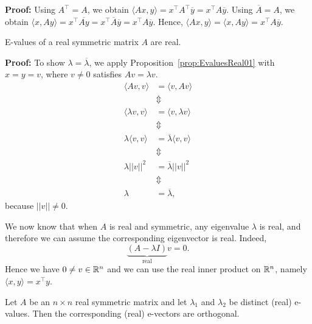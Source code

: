 \textbf{Proof:}  Using $A^\top = A$, we obtain $\langle Ax, y\rangle = x^\top A^\top \overline{y}= x^\top A \overline{y}$. Using $\overline{A} = A$, we obtain $\langle x, Ay \rangle = x^\top \overline{Ay} = x^\top \overline{A} \overline{y} = x^\top A \overline{y}$. Hence,  $\langle Ax, y\rangle = \langle x, Ay \rangle =  x^\top A \overline{y}$. \Qed


\begin{prop}
 E-values of a real symmetric matrix $A$ are real. 
\end{prop}

\textbf{Proof:} To show $\lambda=\overline{\lambda}$, we apply Proposition~\ref{prop:EvaluesReal01} with $x=y=v$, where $v\neq 0$ satisfies $Av = \lambda v$.
\begin{align*}
     \langle Av, v \rangle & =  \langle v, Av \rangle \\
     & \Updownarrow \\
     \langle \lambda v, v \rangle & =  \langle v, \lambda v \rangle \\
     & \Updownarrow \\
     \lambda \langle v, v \rangle & =  \overline{\lambda} \langle v, v \rangle \\
     & \Updownarrow \\
      \lambda ||v||^2  & =  \overline{\lambda} ||v||^2 \\
     & \Updownarrow \\
      \lambda  & =  \overline{\lambda}, 
\end{align*}
because $||v|| \neq 0$.  \Qed

\begin{rem}
We now know that when $A$ is real and symmetric, any eigenvalue $\lambda$ is real, and therefore we can assume the corresponding eigenvector is real. Indeed, $$\underbrace{\left( A-\lambda I\right)}_\text{real}v=0.$$ Hence we have $0 \neq v\in \mathbb R^n$ and we can use the real inner product on $\mathbb R^n$, namely $\langle x,y \rangle=x^\top y$.
\end{rem} 

\begin{prop} 
\label{prop:AsymmetricDistinctEvectorsOrthogonal}
Let $A$ be an $n \times n$ real symmetric matrix and let $\lambda_1$ and $\lambda_2$ be distinct (real) e-values. Then the corresponding (real) e-vectors are orthogonal.
\end{prop}

